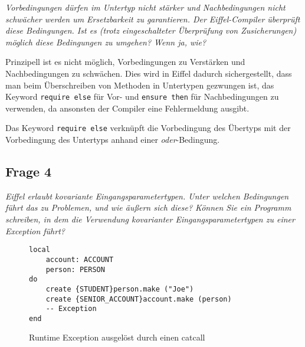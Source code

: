 \documentclass[a4paper,10pt]{article}
\begin{document}
\emph{Vorbedingungen dürfen im Untertyp nicht stärker und Nachbedingungen nicht 
schwächer werden um Ersetzbarkeit zu garantieren. Der Eiffel-Compiler überprüft 
diese Bedingungen. Ist es (trotz eingeschalteter Überprüfung von Zusicherungen) 
möglich diese Bedingungen zu umgehen? Wenn ja, wie?}

\vspace{3mm}


Prinzipell ist es nicht möglich, Vorbedingungen zu Verstärken und Nachbedingungen zu schwächen. Dies wird in Eiffel dadurch sichergestellt, dass man beim Überschreiben von Methoden in Untertypen gezwungen ist, das Keyword \verb+require else+ für Vor- und \verb+ensure then+ für Nachbedingungen zu verwenden, da ansonsten der Compiler eine Fehlermeldung ausgibt.

Das Keyword \verb+require else+ verknüpft die Vorbedingung des Übertyps mit der Vorbedingung des Untertyps anhand einer \textit{oder}-Bedingung.



\subsection{Frage 4}

\emph{Eiffel erlaubt kovariante Eingangsparametertypen. Unter welchen Bedingungen 
führt das zu Problemen, und wie äußern sich diese? Können Sie ein Programm 
schreiben, in dem die Verwendung kovarianter Eingangsparametertypen zu einer 
Exception führt?}

\vspace{3mm}


\begin{comment}
See http://docs.eiffel.com/book/method/et-inheritance#Covariance.2C_anchored_declarations.2C_and_.22catcalls.22
\end{comment}

\begin{figure}
\begin{lstlisting}
local
    account: ACCOUNT
    person: PERSON
do
    create {STUDENT}person.make ("Joe")
    create {SENIOR_ACCOUNT}account.make (person)
    -- Exception
end
\end{lstlisting}
\caption{Runtime Exception ausgel\"ost durch einen catcall}
\end{figure}
\end{document}

